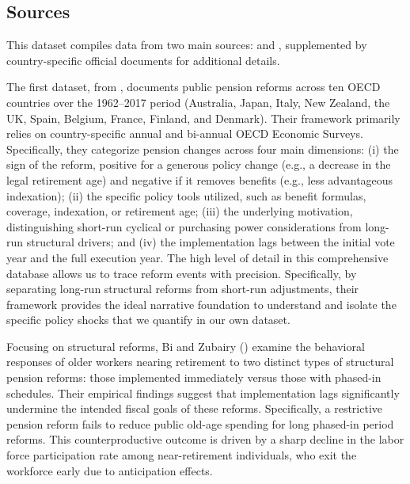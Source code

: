 \documentclass[11pt,english,a4paper, twoside, authoryear]{article}
\begin{document}
\subsection{Sources}

This dataset compiles data from two main sources: \citet{BiZubairy2023} and \citet{romp_political_2024}, supplemented by country-specific official documents for additional details.

The first dataset, from \citet{BiZubairy2023}, documents public pension reforms across ten OECD countries over the 1962–2017 period (Australia, Japan, Italy, New Zealand, the UK, Spain, Belgium, France, Finland, and Denmark). Their framework primarily relies on country-specific annual and bi-annual OECD Economic Surveys. Specifically, they categorize pension changes across four main dimensions: (i) the sign of the reform, positive for a generous policy change (e.g., a decrease in the legal retirement age) and negative if it removes benefits (e.g., less advantageous indexation); (ii) the specific policy tools utilized, such as benefit formulas, coverage, indexation, or retirement age; (iii) the underlying motivation, distinguishing short-run cyclical or purchasing power considerations from long-run structural drivers; and (iv) the implementation lags between the initial vote year and the full execution year. The high level of detail in this comprehensive database allows us to trace reform events with precision. Specifically, by separating long-run structural reforms from short-run adjustments, their framework provides the ideal narrative foundation to understand and isolate the specific policy shocks that we quantify in our own dataset.

Focusing on structural reforms, Bi and Zubairy (\citeyear{BiZubairy2023}) examine the behavioral responses of older workers nearing retirement to two distinct types of structural pension reforms: those implemented immediately versus those with phased-in schedules. Their empirical findings suggest that implementation lags significantly undermine the intended fiscal goals of these reforms. Specifically, a restrictive pension reform fails to reduce public old-age spending for long phased-in period reforms. This counterproductive outcome is driven by a sharp decline in the labor force participation rate among near-retirement individuals, who exit the workforce early due to anticipation effects.
\end{document}
